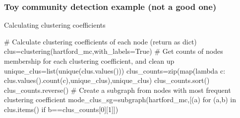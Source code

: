 \documentclass[xcolor=dvipsnames, 9pt]{beamer}
\newenvironment{code}{\begin{semiverbatim} \begin{footnotesize}}
{\end{footnotesize}\end{semiverbatim}}
\begin{document}
\begin{frame}[fragile]
    \frametitle{Toy community detection example (not a good one)}
    \begin{block}{Calculating clustering coefficients}
        \begin{code}
\scriptsize{\alert<2>{# Calculate clustering coefficients of each node (return as dict)
clus=clustering(hartford_mc,with_labels=True)}
\alert<3>{# Get counts of nodes membership for each clustering coefficient, and clean up
unique_clus=list(unique(clus.values()))
clus_counts=zip(map(lambda c: clus.values().count(c),unique_clus),unique_clus)
clus_counts.sort()
clus_counts.reverse()}
\alert<4>{# Create a subgraph from nodes with most frequent clustering coefficient
mode_clus_sg=subgraph(hartford_mc,[(a) for (a,b) in clus.items() if b==clus_counts[0][1]])}}         
        \end{code}
    \end{block}
    \begin{columns}
        \begin{itemize}
        \end{itemize}
            \begin{center}
            \end{center}
    \end{columns}
    \begin{center}
    \end{center}
\end{frame}


\end{document}

